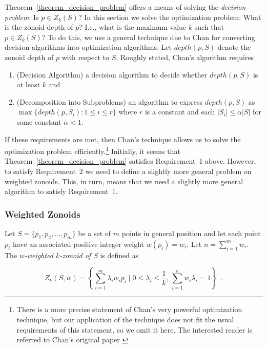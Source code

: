 \documentclass{elsart}
\newcommand{\depth}{\mathit{depth}}
\begin{document}
Theorem~\ref{theorem_decision_problem} offers a means of solving the
\emph{decision problem}: Is $p\in Z_k(S)$?  In this section we solve
the optimization problem:  What is the zonoid depth of $p$? I.e., 
what is the maximum value $k$ such that $p\in Z_k(S)$?  To do this, we
use a general technique due to Chan
\cite{geometric_applications_of_a_randomized_optimization_technique}
for converting decision algorithms into optimization algorithms.  Let
$\depth(p,S)$ denote the zonoid depth of $p$ with respect to $S$.
Roughly stated, Chan's algorithm requires
\begin{enumerate}

\item (Decision Algorithm) a decision algorithm to decide whether
$\depth(p,S)$ is at least $k$ and

\item (Decomposition into Subproblems) an algorithm to express
$\depth(p,S)$ as $\max\{\depth(p,S_i):1\le i\le r\}$ where $r$ is a
constant and each $|S_i|\le \alpha|S|$ for some constant $\alpha < 1$.
\end{enumerate}

If these requirements are met, then Chan's technique
allows us to solve the optimization problem
efficiently.\footnote{There is a more precise statement of Chan's very
powerful optimization technique, but our application of the technique
does not fit the usual requirements of this statement, so we omit it
here.  The interested reader is referred to Chan's original paper
\cite{geometric_applications_of_a_randomized_optimization_technique}}
Initially, it seems that Theorem~\ref{theorem_decision_problem}
satisfies Requirement~1 above.  However, to satisfy Requirement~2 we
need to define a slightly more general problem on weighted zonoids.
This, in turn, means that we need a slightly more general algorithm to
satisfy Requirement~1.


\subsubsection{Weighted Zonoids}
\label{section_decision}

Let $S = \{p_1, p_2, \ldots, p_m\}$ be a set of $m$ points in general
position and let each point $p_i$ have an associated positive integer
weight $w(p_i)=w_i$.  Let $n=\sum_{i=1}^m w_i$.  The \emph{$w$-weighted
$k$-zonoid of $S$} is defined as

\[ Z_k(S,w) = \left\{\sum_{i=1}^{m}\lambda_iw_ip_i \mid 0 \le
\lambda_i \le \frac{1}{k},\, \sum_{i=1}^{n} w_i\lambda_i = 1 \right\}
	\enspace . \]
\end{document}
